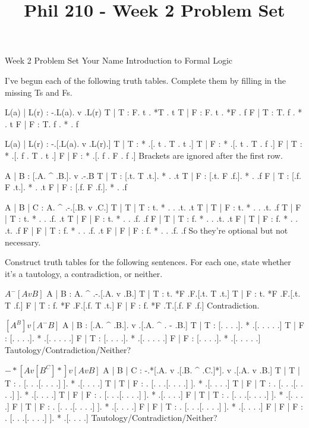 
\title{Phil 210 - Week 2 Problem Set}

\heading
Week 2 Problem Set
Your Name
Introduction to Formal Logic
\endheading

I've begun each of the following truth tables. Complete them by filling in the missing Ts and Fs.

\problems
{}
\truthtable
 L(a) | L(r) : -.L(a).  v  .L(r)
\truthtableline
  T   |  T   : F. t  . *T  . t
  T   |  F   : F. t  . *F  . f
  F   |  T   : T. f  . *   . t
  F   |  F   : T. f  . *   . f
\endtruthtable

\truthtable
 L(a) | L(r) :  -.[.L(a). v .L(r).]
\truthtableline
  T   |  T   : * .[. t  . T . t  .]
  T   |  F   : * .[. t  . T . f  .]
  F   |  T   : * .[. f  . T . t  .]
  F   |  F   : * .[. f  . F . f  .]
\endtruthtable
\Hint Brackets are ignored after the first row.

\truthtable
 A | B : [.A. ^ .B.].  v  .-.B
\truthtableline
 T | T : [.t. T .t.]. *   . .t
 T | F : [.t. F .f.]. *   . .f
 F | T : [.f. F .t.]. *   . .t
 F | F : [.f. F .f.]. *   . .f
\endtruthtable

\truthtable
 A | B | C : A.  ^  .-.[.B. v .C.]
\truthtableline
 T | T | T : t. *   . . .t.   .t
 T | T | F : t. *   . . .t.   .f
 T | F | T : t. *   . . .f.   .t
 T | F | F : t. *   . . .f.   .f
 F | T | T : f. *   . . .t.   .t
 F | T | F : f. *   . . .t.   .f
 F | F | T : f. *   . . .f.   .t
 F | F | F : f. *   . . .f.   .f
\endtruthtable
\Hint So they're optional but not necessary.

\endproblems
\pagebreak

Construct truth tables for the following sentences. For each one, state whether it's a tautology, a contradiction, or neither.

\problems
{}
$ A ^ -[A v B] $
	\answer
	\truthtable
	 A | B : A.  ^  .-.[.A. v .B.]
	\truthtableline
	 T | T : t. *F  .F.[.t. T .t.]
	 T | F : t. *F  .F.[.t. T .f.]
	 F | T : f. *F  .F.[.f. T .t.]
	 F | F : f. *F  .T.[.f. F .f.]
	\endtruthtable
	Contradiction.
	\endanswer

$ [A ^ B] v [A ^ -B] $
	\answer
	\truthtable
	 A | B : [.A. ^ .B.].  v  .[.A. ^ . - .B.]
	\truthtableline
	 T | T : [. .   . .]. *   .[. .   .   . .]
	 T | F : [. .   . .]. *   .[. .   .   . .]
	 F | T : [. .   . .]. *   .[. .   .   . .]
	 F | F : [. .   . .]. *   .[. .   .   . .]
	\endtruthtable
	Tautology/Contradiction/Neither?
	\endanswer

$ -*[A v [B ^ C]*] v [A v B] $
	\answer
	\truthtable
	 A | B | C : -.*[.A. v .[.B. ^ .C.]*].  v  .[.A. v .B.]
	\truthtableline
	 T | T | T :  . [. .   .[. .   . .] ]. *   .[. .   . .]
	 T | T | F :  . [. .   .[. .   . .] ]. *   .[. .   . .]
	 T | F | T :  . [. .   .[. .   . .] ]. *   .[. .   . .]
	 T | F | F :  . [. .   .[. .   . .] ]. *   .[. .   . .]
	 F | T | T :  . [. .   .[. .   . .] ]. *   .[. .   . .]
	 F | T | F :  . [. .   .[. .   . .] ]. *   .[. .   . .]
	 F | F | T :  . [. .   .[. .   . .] ]. *   .[. .   . .]
	 F | F | F :  . [. .   .[. .   . .] ]. *   .[. .   . .]
	\endtruthtable
	Tautology/Contradiction/Neither?
	\endanswer

